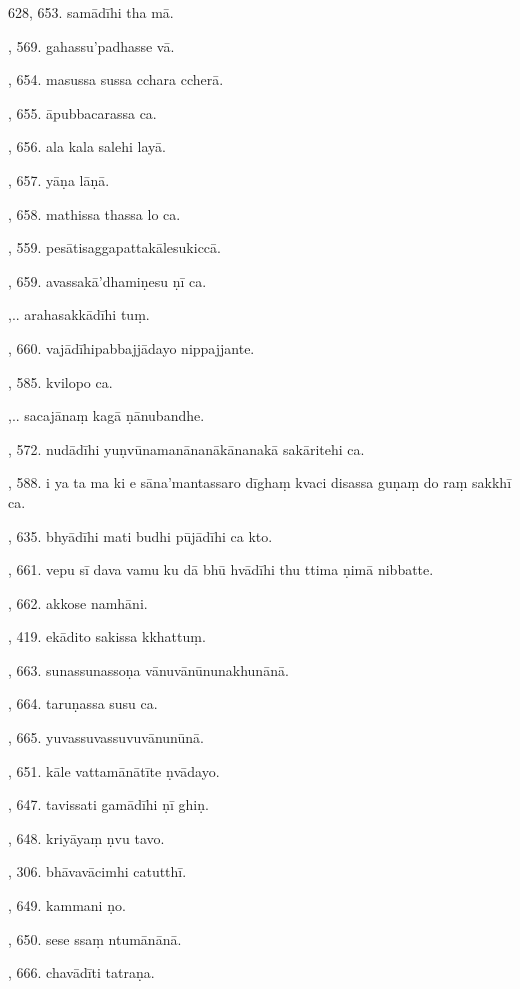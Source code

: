 628, 653. samādīhi tha mā.\par {}, 569. gahassu’padhasse vā.\par {}, 654. masussa sussa cchara ccherā.\par {}, 655. āpubbacarassa ca.\par {}, 656. ala kala salehi layā.\par {}, 657. yāṇa lāṇā.\par {}, 658. mathissa thassa lo ca.\par {}, 559. pesātisaggapattakālesukiccā.\par {}, 659. avassakā’dhamiṇesu ṇī ca.\par {},.. arahasakkādīhi tuṃ.\par {}, 660. vajādīhipabbajjādayo nippajjante.\par {}, 585. kvilopo ca.\par {},.. sacajānaṃ kagā ṇānubandhe.\par {}, 572. nudādīhi yuṇvūnamanānanākānanakā sakāritehi ca.\par {}, 588. i ya ta ma ki e sāna’mantassaro dīghaṃ kvaci disassa guṇaṃ do raṃ sakkhī ca.\par {}, 635. bhyādīhi mati budhi pūjādīhi ca kto.\par {}, 661. vepu sī dava vamu ku dā bhū hvādīhi thu ttima ṇimā nibbatte.\par {}, 662. akkose namhāni.\par {}, 419. ekādito sakissa kkhattuṃ.\par {}, 663. sunassunassoṇa vānuvānūnunakhunānā.\par {}, 664. taruṇassa susu ca.\par {}, 665. yuvassuvassuvuvānunūnā.\par {}, 651. kāle vattamānātīte ṇvādayo.\par {}, 647. tavissati gamādīhi ṇī ghiṇ.\par {}, 648. kriyāyaṃ ṇvu tavo.\par {}, 306. bhāvavācimhi catutthī.\par {}, 649. kammani ṇo.\par {}, 650. sese ssaṃ ntumānānā.\par {}, 666. chavādīti tatraṇa.\par \noindent
